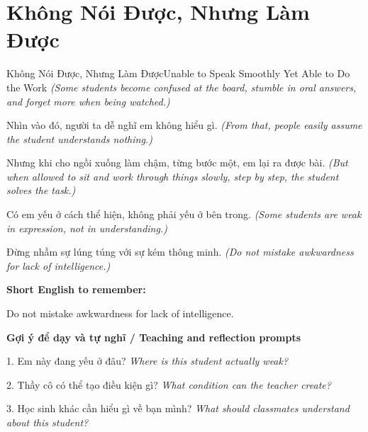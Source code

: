 \section{Không Nói Được, Nhưng Làm Được}
\begin{truyen}{Không Nói Được, Nhưng Làm Được}{Unable to Speak Smoothly Yet Able to Do the Work}
\textit{(Some students become confused at the board, stumble in oral answers, and forget more when being watched.)}

Nhìn vào đó, người ta dễ nghĩ em không hiểu gì.
\textit{(From that, people easily assume the student understands nothing.)}

Nhưng khi cho ngồi xuống làm chậm, từng bước một, em lại ra được bài.
\textit{(But when allowed to sit and work through things slowly, step by step, the student solves the task.)}

Có em yếu ở cách thể hiện, không phải yếu ở bên trong.
\textit{(Some students are weak in expression, not in understanding.)}

\end{truyen}

\begin{baihoc}
Đừng nhầm sự lúng túng với sự kém thông minh.
\textit{(Do not mistake awkwardness for lack of intelligence.)}
\end{baihoc}

\begin{ghinhoanh}
\textbf{Short English to remember:}

Do not mistake awkwardness for lack of intelligence.

\end{ghinhoanh}

\begin{tuhocnhanh}
\textbf{Gợi ý để dạy và tự nghĩ / Teaching and reflection prompts}

1. Em này đang yếu ở đâu? \textit{Where is this student actually weak?}

2. Thầy cô có thể tạo điều kiện gì? \textit{What condition can the teacher create?}

3. Học sinh khác cần hiểu gì về bạn mình? \textit{What should classmates understand about this student?}
\end{tuhocnhanh}
\ngancach

